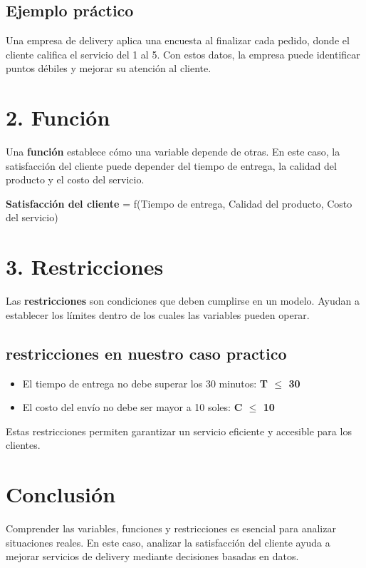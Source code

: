 \documentclass[12pt]{article}
\begin{document}
\subsection*{Ejemplo práctico}
Una empresa de delivery aplica una encuesta al finalizar cada pedido, donde el cliente califica el servicio del 1 al 5. Con estos datos, la empresa puede identificar puntos débiles y mejorar su atención al cliente.

\section*{2. Función}
Una \textbf{función} establece cómo una variable depende de otras. En este caso, la satisfacción del cliente puede depender del tiempo de entrega, la calidad del producto y el costo del servicio.

\begin{center}
\textbf{Satisfacción del cliente} = f(Tiempo de entrega, Calidad del producto, Costo del servicio)
\end{center}

\section*{3. Restricciones}
Las \textbf{restricciones} son condiciones que deben cumplirse en un modelo. Ayudan a establecer los límites dentro de los cuales las variables pueden operar.

\subsection*{ restricciones en nuestro caso practico}
\begin{itemize}
    \item El tiempo de entrega no debe superar los 30 minutos: \textbf{T $\leq$ 30}
    \item El costo del envío no debe ser mayor a 10 soles: \textbf{C $\leq$ 10}
\end{itemize}

Estas restricciones permiten garantizar un servicio eficiente y accesible para los clientes.

\section*{Conclusión}
Comprender las variables, funciones y restricciones es esencial para analizar situaciones reales. En este caso, analizar la satisfacción del cliente ayuda a mejorar servicios de delivery mediante decisiones basadas en datos.
\end{document}
